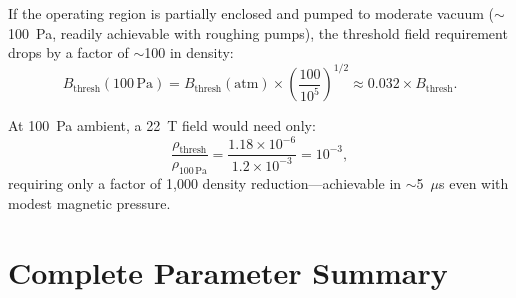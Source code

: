 \documentclass[amsmath,amssymb,aps,prd,superscriptaddress,nofootinbib]{revtex4-2}
\begin{document}
If the operating region is partially enclosed and pumped to moderate
vacuum ($\sim$100~Pa, readily achievable with roughing pumps), the
threshold field requirement drops by a factor of $\sim$100 in
density:
\begin{equation}
B_\text{thresh}(100\,\text{Pa}) = B_\text{thresh}(\text{atm})
\times \left(\frac{100}{10^5}\right)^{1/2} \approx 0.032 \times B_\text{thresh}.
\end{equation}

At 100~Pa ambient, a 22~T field would need only:
\begin{equation}
\frac{\rho_\text{thresh}}{\rho_{100\,\text{Pa}}} = \frac{1.18 \times 10^{-6}}{1.2 \times 10^{-3}}
= 10^{-3},
\end{equation}
requiring only a factor of 1{,}000 density reduction---achievable in
$\sim$5~$\mu$s even with modest magnetic pressure.

\section{Complete Parameter Summary}\label{sec:summary}
\end{document}
